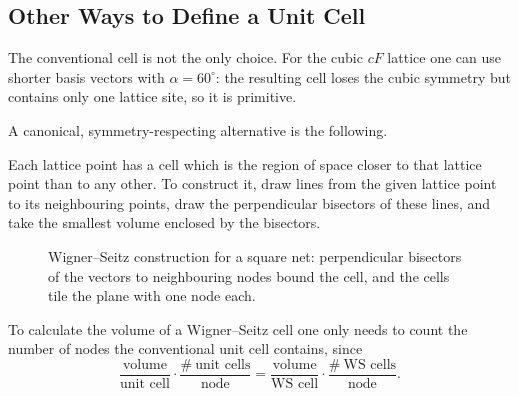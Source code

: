 \subsection{Other Ways to Define a Unit Cell}

The conventional cell is not the only choice. For the cubic $cF$ lattice one can use shorter basis vectors with $\alpha = 60^\circ$: the resulting cell loses the cubic symmetry but contains only one lattice site, so it is primitive.

A canonical, symmetry-respecting alternative is the following.

\begin{definition}
Each lattice point has a cell which is the region of space closer to that lattice point than to any other. To construct it, draw lines from the given lattice point to its neighbouring points, draw the perpendicular bisectors of these lines, and take the smallest volume enclosed by the bisectors.
\end{definition}

\begin{figure}[ht]
\centering
{}
\caption{Wigner--Seitz construction for a square net: perpendicular bisectors of the vectors to neighbouring nodes bound the cell, and the cells tile the plane with one node each.}
\label{fig:xrd-ws}
\end{figure}

To calculate the volume of a Wigner--Seitz cell one only needs to count the number of nodes the conventional unit cell contains, since
\begin{equation}
    \frac{\text{volume}}{\text{unit cell}}\cdot\frac{\#\ \text{unit cells}}{\text{node}}
    = \frac{\text{volume}}{\text{WS cell}}\cdot\frac{\#\ \text{WS cells}}{\text{node}} .
\end{equation}



